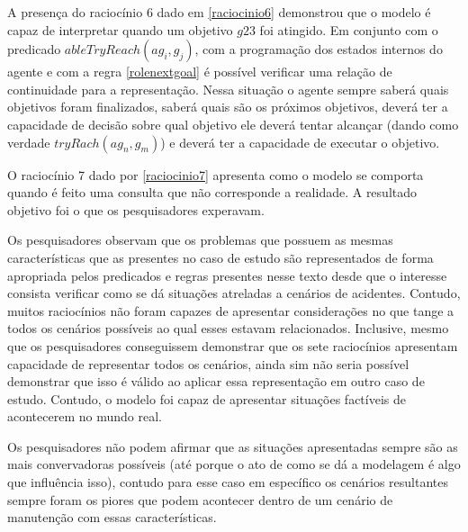 A presença do raciocínio 6 dado em \ref{raciocinio6} demonstrou que o modelo é capaz de interpretar quando um objetivo $g23$ foi atingido. Em 
conjunto com o predicado $ableTryReach(ag_i,g_j)$, com a programação dos estados internos do agente e com a regra \ref{rolenextgoal} é possível 
verificar uma relação de continuidade para a representação. Nessa situação o agente sempre saberá quais objetivos foram finalizados, saberá 
quais são os próximos objetivos, deverá ter a capacidade de decisão sobre qual objetivo ele deverá tentar alcançar 
(dando como verdade $tryRach(ag_n,g_m)$) e deverá ter a capacidade de executar o objetivo. 

O raciocínio 7 dado por \ref{raciocinio7} apresenta como o modelo se comporta quando é feito uma consulta que não corresponde a realidade. A resultado 
objetivo foi o que os pesquisadores experavam. 

Os pesquisadores observam que os problemas que possuem as mesmas características que as presentes no caso de estudo são representados de forma apropriada
pelos predicados e regras presentes nesse texto desde que o interesse consista verificar como se dá situações atreladas a cenários de acidentes. Contudo, 
muitos raciocínios não foram capazes de apresentar considerações no que tange a todos os cenários possíveis ao qual esses estavam relacionados. Inclusive, 
mesmo que os pesquisadores conseguissem demonstrar que os sete raciocínios apresentam capacidade de representar todos os cenários, ainda sim não seria 
possível demonstrar que isso é válido ao aplicar essa representação em outro caso de estudo. Contudo, o modelo foi capaz de apresentar situações factíveis 
de acontecerem no mundo real. 

Os pesquisadores não podem afirmar que as situações apresentadas sempre são as mais convervadoras possíveis (até porque 
o ato de como se dá a modelagem é algo que influência isso), contudo para esse caso em específico os cenários resultantes sempre foram os piores que 
podem acontecer dentro de um cenário de manutenção com essas características. 

